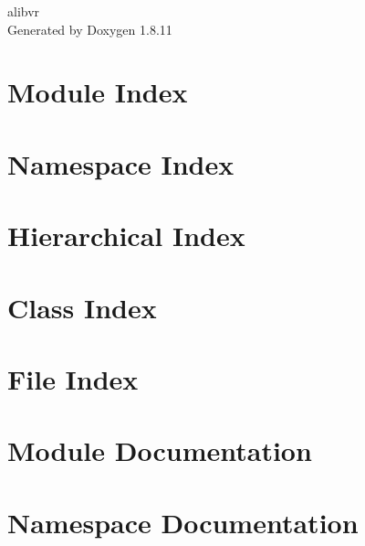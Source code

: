 \documentclass[twoside]{book}
\newcommand{\+}{\discretionary{\mbox{\scriptsize$\hookleftarrow$}}{}{}}
\newcommand{\clearemptydoublepage}{%
  \newpage{\pagestyle{empty}\cleardoublepage}%
}
\begin{document}
\hypersetup{pageanchor=false,
             bookmarksnumbered=true,
             pdfencoding=unicode
            }
\begin{titlepage}
\vspace*{7cm}
\begin{center}%
{\Large alibvr }\\
\vspace*{1cm}
{\large Generated by Doxygen 1.8.11}\\
\end{center}
\end{titlepage}
\clearemptydoublepage
\tableofcontents
\clearemptydoublepage
{}
\hypersetup{pageanchor=true}

\chapter{Module Index}

\chapter{Namespace Index}

\chapter{Hierarchical Index}

\chapter{Class Index}

\chapter{File Index}

\chapter{Module Documentation}

\chapter{Namespace Documentation}


\end{document}
